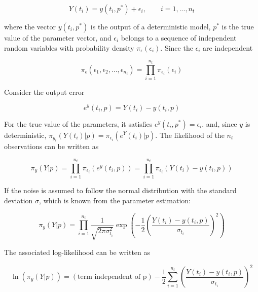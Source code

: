 \documentclass[../Article_Design_of_Experiment.tex]{subfiles}
\begin{document}
	{\footnotesize
	\begin{equation}
		Y(t_i) = y(t_i, p^*) + \epsilon_i, \qquad i=1,...,n_t
	\end{equation} }
	
	where the vector $y(t_i, p^*)$ is the output of a deterministic model, $p^*$ is the true value of the parameter vector, and $\epsilon_i$ belongs to a sequence of independent random variables with probability density $\pi_{\epsilon}(\epsilon_i)$. Since the $\epsilon_i$ are independent
	
	{\footnotesize
	\begin{equation}
		\pi_{\epsilon}(\epsilon_1, \epsilon_2, ..., \epsilon_{n_t}) = \prod_{i=1}^{n_t} \pi_{\epsilon_i}(\epsilon_i)
	\end{equation} }
	
	Consider the output error
	
	{\footnotesize
	\begin{equation}
		e^y(t_i, p) = Y(t_i) - y(t_i, p)
	\end{equation} }
	
	For the true value of the parameters, it satisfies $e^y(t_i, p^*)=\epsilon_i$. and, since $y$ is deterministic, $\pi_{y_i} (Y(t_i)|p) = \pi_{\epsilon_i} (e^Y(t_i)|p)$. The likelihood of the $n_t$ observations can be written as
	
	{\footnotesize
	\begin{equation}
		\pi_y (Y|p) = \prod_{i=1}^{n_t} \pi_{\epsilon_i}(e^y(t_i,p)) =  \prod_{i=1}^{n_t} \pi_{\epsilon_i}(Y(t_i) - y(t_i, p))
	\end{equation} }
	
	If the noise is assumed to follow the normal distribution with the standard deviation $\sigma$, which is known from the parameter estimation:
	
	{\footnotesize
	\begin{equation}
		\pi_y (Y|p) = \prod_{i=1}^{n_t} \frac{1}{ \sqrt{2\pi\sigma_{t_i}^2} } \exp \left( -\frac{1}{2} \left( \frac{Y(t_i) - y(t_i, p)}{\sigma_{t_i}} \right)^2 \right)
	\end{equation} }
	
	The associated log-likelihood can be written as
	
	{\footnotesize
	\begin{equation}
		\ln (\pi_y (Y|p)) = (\text{term independent of p}) - \frac{1}{2} \sum_{i=1}^{n_t}  \left( \frac{Y(t_i) - y(t_i, p)}{\sigma_{t_i}} \right)^2
	\end{equation} }
	
\end{document}
